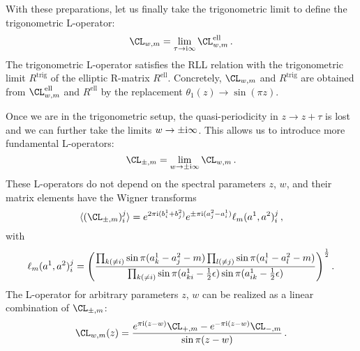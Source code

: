 With these preparations, let us finally take the trigonometric limit
to define the trigonometric L-operator:
\begin{equation}
  \CL_{w,m}
  = \lim_{\tau \to \iu\infty} \CL^{\text{ell}}_{w,m} \,.
\end{equation}
The trigonometric L-operator satisfies the RLL relation with the
trigonometric limit $R^{\text{trig}}$ of the elliptic R-matrix
$R^{\text{ell}}$.  Concretely, $\CL_{w,m}$ and $R^{\text{trig}}$ are
obtained from $\CL^{\text{ell}}_{w,m}$ and $R^{\text{ell}}$ by the
replacement $\theta_1(z) \to \sin(\pi z)$.

Once we are in the trigonometric setup, the quasi-periodicity in
$z \to z + \tau$ is lost and we can further take the limits
$w \to \pm\mathrm{i}\infty$.  This allows us to introduce more fundamental
L-operators:
\begin{equation}
  \label{eq:fund-L}
  \CL_{\pm,m} = \lim_{w \to \pm\iu\infty} \CL_{w,m} \,.
\end{equation}
These L-operators do not depend on the spectral parameters $z$, $w$,
and their matrix elements have the Wigner transforms
\begin{equation}
  \label{eq:fund-L-ij}
  \vev{(\CL_{\pm,m})_i^j}
  =
  e^{2\pi\iu(b_i^1 + b_j^2)}
  e^{\pm\pi\iu(a^2_j - a^1_i)}
  \ell_m(a^1, a^2)_i^j \,,
\end{equation}
with
\begin{equation}
  \label{eq:ell}
  \ell_m(a^1, a^2)_i^j
  =
  \Biggl(
  \frac{\prod_{k (\neq i)} \sin\pi(a^1_k - a^2_j - m)
        \prod_{l (\neq j)} \sin\pi(a^1_i - a^2_l - m)}
       {\prod_{k (\neq i)}\sin\pi(a^1_{ki} - \frac12\epsilon)
        \sin\pi(a^1_{ik} - \frac12\epsilon)}
  \Biggr)^{\frac12}
  \,.
\end{equation}
The L-operator for arbitrary parameters $z$, $w$ can be realized as a
linear combination of $\CL_{\pm,m}$:
\begin{equation}
  \CL_{w,m}(z)
  =
  \frac{e^{\pi\iu(z-w)} \CL_{+,m} - e^{-\pi\iu(z-w)} \CL_{-,m}}{\sin\pi(z-w)}
  \,.
\end{equation}

